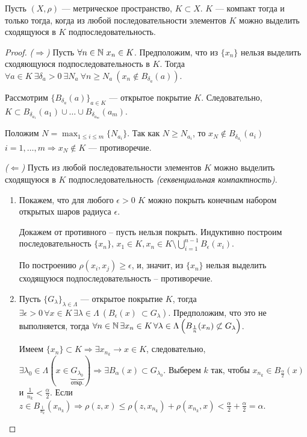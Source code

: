 \begin{theorem}
    \label{compact-criterion}
    Пусть $(X, \rho)$ --- метрическое пространство, $K \subset X$. $K$ --- компакт тогда и только тогда, когда из любой последовательности элементов $K$ можно выделить сходящуюся в $K$ подпоследовательность.

    \begin{proof}
        \emph{($\Rightarrow$)} Пусть $\forall n \in \mathbb{N} \ x_n \in K$. Предположим, что из $\{x_n\}$ нельзя выделить сходяющуюся подпоследовательность в $K$. Тогда $\forall a \in K \ \exists \delta_a > 0 \ \exists N_a \ \forall n \ge N_a \ (x_n \not\in B_{\delta_a}(a))$.

        Рассмотрим $\{B_{\delta_a}(a)\}_{a \in K}$ --- открытое покрытие $K$. Следовательно, $K \subset B_{\delta_{a_1}}(a_1) \cup \ldots \cup B_{\delta_{a_m}}(a_m)$.
    
        Положим $N = \max_{1 \le i \le m} \{N_{a_i}\}$. Так как $N \ge N_{a_i}$, то $x_N \not\in B_{\delta_{a_i}}(a_i)$ $i = 1, \ldots, m \Rightarrow x_N \not\in K$ --- противоречие.
    
        \emph{($\Leftarrow$)} Пусть из любой последовательности элементов $K$ можно выделить сходящуюся в $K$ подпоследовательность \emph{(секвенциальная компактность)}.

        \begin{enumerate}
            \item Покажем, что для любого $\epsilon > 0$ $K$ можно покрыть конечным набором открытых шаров радиуса $\epsilon$.
    
            Докажем от противного -- пусть нельзя покрыть. Индуктивно построим последовательность $\{x_n\}$, $x_1 \in K, x_n \in K \setminus \bigcup_{i = 1}^{n - 1} B_\epsilon(x_i)$.
    
            По построению $\rho(x_i, x_j) \geq \epsilon$, и, значит, из $\{x_n\}$ нельзя выделить сходящуюся подпоследовательность -- противоречие.
    
            \item Пусть $\{G_\lambda\}_{\lambda \in \Lambda}$ --- открытое покрытие $K$, тогда $\exists \epsilon > 0 \, \forall x \in K \, \exists \lambda \in \Lambda \ \left(B_\epsilon(x) \ \subset G_\lambda\right)$. Предположим, что это не выполняется, тогда $\forall n \in \mathbb{N} \, \exists x_n \in K \, \forall \lambda \in \Lambda \left(B_{\frac{1}{n}}(x_n) \not\subset G_\lambda\right)$.
    
            Имеем $\{x_n\} \subset K \Rightarrow \exists x_{n_k} \rightarrow x \in K$, следовательно, $\exists \lambda_0 \in \Lambda (x \in \underbrace{G_{\lambda_0}}_{\text{откр.}}) \Rightarrow \exists B_{\alpha}(x) \subset G_{\lambda_0}$. Выберем $k$ так, чтобы $x_{n_k} \in B_{\frac{\alpha}{2}}(x)$ и $\frac{1}{n_k} < \frac{\alpha}{2}$. Если $z \in B_{\frac{1}{n_k}}(x_{n_k}) \Rightarrow \rho(z, x) \le \rho(z, x_{n_k}) + \rho(x_{n_k}, x) < \frac{\alpha}{2} + \frac{\alpha}{2} = \alpha$.
    

\end{enumerate}
\end{proof}
\end{theorem}
